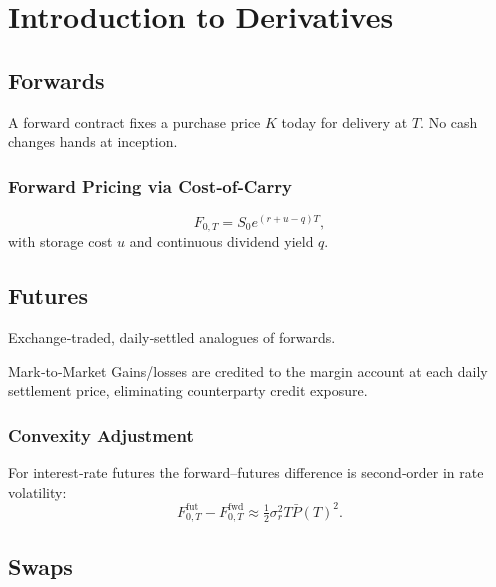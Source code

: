 \chapter{Introduction to Derivatives}\label{ch:derivintro}

\begin{abstract}
Derivatives transform the payoff profile of cash instruments, enabling
leverage, hedging, and access to otherwise illiquid exposures.
We introduce forwards, futures and swaps—the building blocks for options.
\end{abstract}

\section{Forwards}

A forward contract fixes a purchase price \(K\) today for delivery at \(T\).
No cash changes hands at inception.

\subsection{Forward Pricing via Cost‑of‑Carry}

\[
F_{0,T} = S_0 e^{(r + u - q)T},
\]
with storage cost \(u\) and continuous dividend yield \(q\).

\section{Futures}

Exchange‑traded, daily‑settled analogues of forwards.

\begin{definition}{Mark‑to‑Market}{}
Gains/losses are credited to the margin account at each daily settlement
price, eliminating counterparty credit exposure.
\end{definition}

\subsection{Convexity Adjustment}

For interest‑rate futures the forward–futures difference is
second‑order in rate volatility:
\[
F^{\text{fut}}_{0,T} - F^{\text{fwd}}_{0,T}
      \approx \tfrac12 \sigma_r^2 T \bar P(T)^2 .
\]

\section{Swaps}

